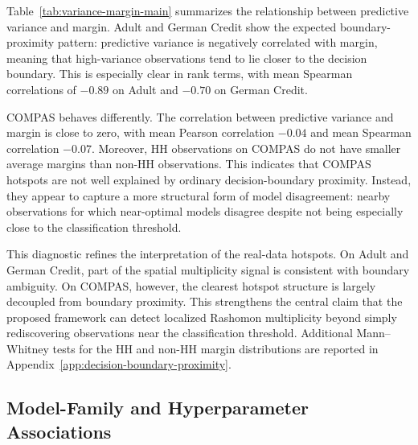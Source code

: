 Table~\ref{tab:variance-margin-main} summarizes the relationship between predictive
variance and margin. Adult and German Credit show the expected boundary-proximity
pattern: predictive variance is negatively correlated with margin, meaning that
high-variance observations tend to lie closer to the decision boundary. This is especially
clear in rank terms, with mean Spearman correlations of $-0.89$ on Adult and $-0.70$
on German Credit.

COMPAS behaves differently. The correlation between predictive variance and margin is
close to zero, with mean Pearson correlation $-0.04$ and mean Spearman correlation
$-0.07$. Moreover, HH observations on COMPAS do not have smaller average margins
than non-HH observations. This indicates that COMPAS hotspots are not well explained
by ordinary decision-boundary proximity. Instead, they appear to capture a more
structural form of model disagreement: nearby observations for which near-optimal
models disagree despite not being especially close to the classification threshold.

\begin{table}[htbp]
\centering
\caption{Variance--margin relationship by dataset (mean $\pm$ standard deviation across runs). 
Margin is defined as $m_i = |\bar{p}_i - 0.5|$, so lower values indicate observations closer to 
the decision boundary. HH and non-HH columns report the average margin inside and outside variance-based HH hotspots.}
\label{tab:variance-margin-main}

\end{table}

This diagnostic refines the interpretation of the real-data hotspots. On Adult and German
Credit, part of the spatial multiplicity signal is consistent with boundary ambiguity. On
COMPAS, however, the clearest hotspot structure is largely decoupled from boundary
proximity. This strengthens the central claim that the proposed framework can detect
localized Rashomon multiplicity beyond simply rediscovering observations near the
classification threshold. Additional Mann--Whitney tests for the HH and non-HH margin
distributions are reported in Appendix~\ref{app:decision-boundary-proximity}.

\subsection{Model-Family and Hyperparameter Associations}
\label{sec:results-hp}

